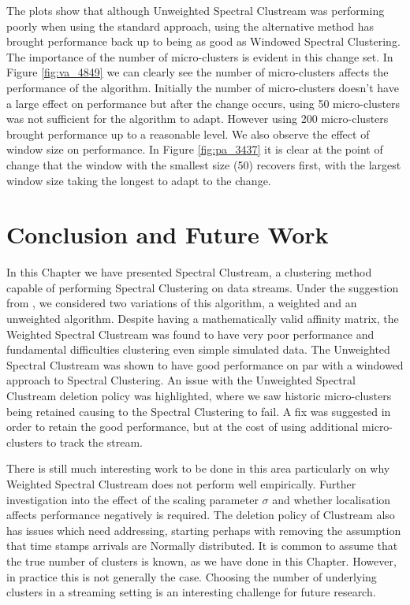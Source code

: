 The plots show that although Unweighted Spectral Clustream was performing poorly when using the standard approach, using the alternative method has brought performance back up to being as good as Windowed Spectral Clustering.  The importance of the number of micro-clusters is evident in this change set.  In Figure \ref{fig:va_4849} we can clearly see the number of micro-clusters affects the performance of the algorithm. Initially the number of micro-clusters doesn't have a large effect on performance but after the change occurs, using 50 micro-clusters was not sufficient for the algorithm to adapt. However using 200 micro-clusters brought performance up to a reasonable level.  We also observe the effect of window size on performance. In Figure \ref{fig:pa_3437} it is clear at the point of change that the window with the smallest size (50) recovers first, with the largest window size taking the longest to adapt to the change.

\section{Conclusion and Future Work}
\label{sec:clustream_conc}

In this Chapter we have presented Spectral Clustream, a clustering method capable of performing Spectral Clustering on data streams. Under the suggestion from \cite{Zhang1996a}, we considered two variations of this algorithm, a weighted and an unweighted algorithm. Despite having a mathematically valid affinity matrix, the Weighted Spectral Clustream was found to have very poor performance and fundamental difficulties clustering even simple simulated data. The Unweighted Spectral Clustream was shown to have good performance on par with a windowed approach to Spectral Clustering. An issue with the Unweighted Spectral Clustream deletion policy was highlighted, where we saw historic micro-clusters being retained causing to the Spectral Clustering to fail. A fix was suggested in order to retain the good performance, but at the cost of using additional micro-clusters to track the stream.

There is still much interesting work to be done in this area particularly on why Weighted Spectral Clustream does not perform well empirically. Further investigation into the effect of the scaling parameter $\sigma$ and whether localisation affects performance negatively is required. The deletion policy of Clustream also has issues which need addressing, starting perhaps with removing the assumption that time stamps arrivals are Normally distributed. It is common to assume that the true number of clusters is known, as we have done in this Chapter. However, in practice this is not generally the case. Choosing the number of underlying clusters in a streaming setting is an interesting challenge for future research.

